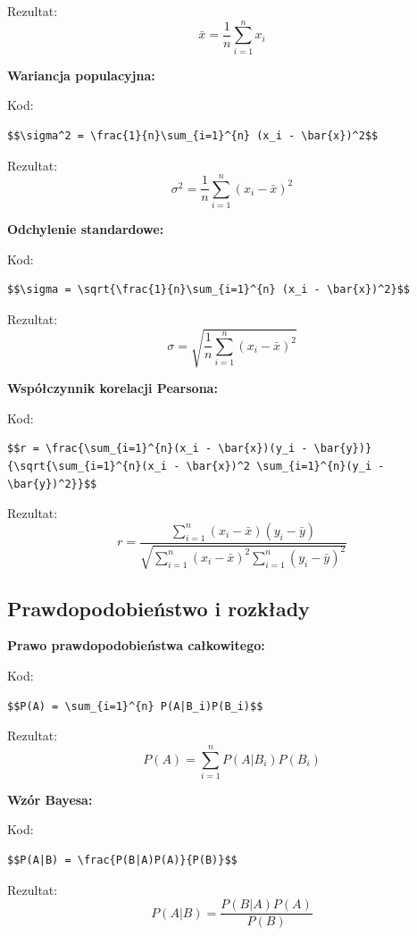 \documentclass[
  polish,
  letterpaper,
  DIV=11,
  numbers=noendperiod]{scrreprt}
\begin{document}
Rezultat: \[\bar{x} = \frac{1}{n}\sum_{i=1}^{n} x_i\]

\textbf{Wariancja populacyjna:}

Kod:

\begin{verbatim}
$$\sigma^2 = \frac{1}{n}\sum_{i=1}^{n} (x_i - \bar{x})^2$$
\end{verbatim}

Rezultat: \[\sigma^2 = \frac{1}{n}\sum_{i=1}^{n} (x_i - \bar{x})^2\]

\textbf{Odchylenie standardowe:}

Kod:

\begin{verbatim}
$$\sigma = \sqrt{\frac{1}{n}\sum_{i=1}^{n} (x_i - \bar{x})^2}$$
\end{verbatim}

Rezultat:
\[\sigma = \sqrt{\frac{1}{n}\sum_{i=1}^{n} (x_i - \bar{x})^2}\]

\textbf{Współczynnik korelacji Pearsona:}

Kod:

\begin{verbatim}
$$r = \frac{\sum_{i=1}^{n}(x_i - \bar{x})(y_i - \bar{y})}{\sqrt{\sum_{i=1}^{n}(x_i - \bar{x})^2 \sum_{i=1}^{n}(y_i - \bar{y})^2}}$$
\end{verbatim}

Rezultat:
\[r = \frac{\sum_{i=1}^{n}(x_i - \bar{x})(y_i - \bar{y})}{\sqrt{\sum_{i=1}^{n}(x_i - \bar{x})^2 \sum_{i=1}^{n}(y_i - \bar{y})^2}}\]

\subsection{Prawdopodobieństwo i
rozkłady}\label{prawdopodobieux144stwo-i-rozkux142ady}

\textbf{Prawo prawdopodobieństwa całkowitego:}

Kod:

\begin{verbatim}
$$P(A) = \sum_{i=1}^{n} P(A|B_i)P(B_i)$$
\end{verbatim}

Rezultat: \[P(A) = \sum_{i=1}^{n} P(A|B_i)P(B_i)\]

\textbf{Wzór Bayesa:}

Kod:

\begin{verbatim}
$$P(A|B) = \frac{P(B|A)P(A)}{P(B)}$$
\end{verbatim}

Rezultat: \[P(A|B) = \frac{P(B|A)P(A)}{P(B)}\]
\end{document}
